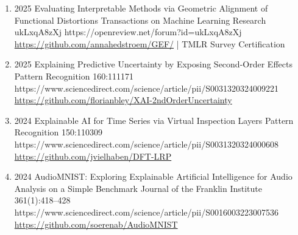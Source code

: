 {\begin{enumerate}
    \item {}
                        {2025}
                        {Evaluating Interpretable Methods via Geometric Alignment of Functional Distortions}
                        {Transactions on Machine Learning Research}
                        {ukLxqA8zXj}
                        {https://openreview.net/forum?id=ukLxqA8zXj}
                        {\\ \href{https://github.com/annahedstroem/GEF/}{https://github.com/annahedstroem/GEF/} | TMLR Survey Certification}

    \item {}
                        {2025}
                        {Explaining Predictive Uncertainty by Exposing Second-Order Effects}
                        {Pattern Recognition}
                        {160:111171}
                        {https://www.sciencedirect.com/science/article/pii/S0031320324009221}
                        {\\ \href{https://github.com/florianbley/XAI-2ndOrderUncertainty}{https://github.com/florianbley/XAI-2ndOrderUncertainty}}

    \item {}
                        {2024}
                        {Explainable AI for Time Series via Virtual Inspection Layers}
                        {Pattern Recognition}
                        {150:110309}
                        {https://www.sciencedirect.com/science/article/pii/S0031320324000608}
                        {\\ \href{https://github.com/jvielhaben/DFT-LRP}{https://github.com/jvielhaben/DFT-LRP}}

    \item {}
                        {2024}
                        {AudioMNIST: Exploring Explainable Artificial Intelligence for Audio Analysis on a Simple Benchmark}
                        {Journal of the Franklin Institute}
                        {361(1):418--428}
                        {https://www.sciencedirect.com/science/article/pii/S0016003223007536}
                        {\\\href{https://github.com/soerenab/AudioMNIST}{https://github.com/soerenab/AudioMNIST}}


\end{enumerate}}
